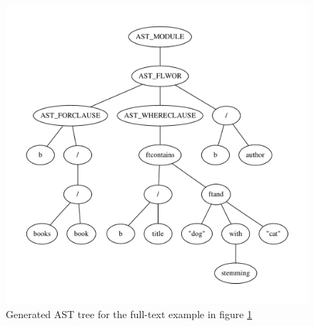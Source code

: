 \begin{figure}[h!]
\centering
 \includegraphics[width=1\textwidth]{img/graphs/ftq1}
\caption{Generated AST tree for the full-text example in figure \ref{tree:ast:ftq1}}
\label{tree:ast:ftq1}
\end{figure}